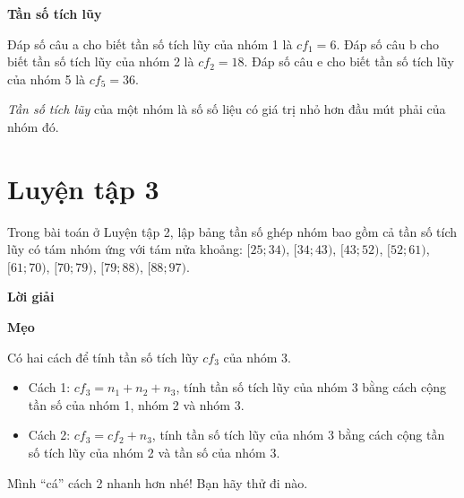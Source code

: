 \documentclass[
  letterpaper,
  DIV=11,
  numbers=noendperiod]{scrartcl}
\providecommand{\tightlist}{%
  \setlength{\itemsep}{0pt}\setlength{\parskip}{0pt}}\usepackage{longtable,booktabs,array}
\begin{document}
\begin{tcolorbox}[enhanced jigsaw, toprule=.15mm, colback=white, bottomrule=.15mm, opacityback=0, leftrule=.75mm, rightrule=.15mm, colframe=quarto-callout-note-color-frame, arc=.35mm, breakable, left=2mm]

\vspace{-3mm}\textbf{Tần số tích lũy}\vspace{3mm}

Đáp số câu a cho biết tần số tích lũy của nhóm 1 là \(cf_1=6\). Đáp số
câu b cho biết tần số tích lũy của nhóm 2 là \(cf_2=18\). Đáp số câu e
cho biết tần số tích lũy của nhóm 5 là \(cf_5=36\).

\emph{Tần số tích lũy} của một nhóm là số số liệu có giá trị nhỏ hơn đầu
mút phải của nhóm đó.

\end{tcolorbox}

\section*{Luyện tập 3}

Trong bài toán ở Luyện tập 2, lập bảng tần số ghép nhóm bao gồm cả tần
số tích lũy có tám nhóm ứng với tám nửa khoång: \([25; 34)\),
\([34; 43)\), \([43; 52)\), \([52; 61)\), \([61; 70)\), \([70; 79)\),
\([79 ; 88)\), \([88; 97)\).

\begin{center}
\textbf{Lời giải}
\end{center}

\begin{tcolorbox}[enhanced jigsaw, toprule=.15mm, colback=white, bottomrule=.15mm, opacityback=0, leftrule=.75mm, rightrule=.15mm, colframe=quarto-callout-note-color-frame, arc=.35mm, breakable, left=2mm]

\vspace{-3mm}\textbf{Mẹo}\vspace{3mm}

Có hai cách để tính tần số tích lũy \(cf_3\) của nhóm 3.

\begin{itemize}
\tightlist
\item
  Cách 1: \(cf_3=n_1+n_2+n_3\), tính tần số tích lũy của nhóm 3 bằng
  cách cộng tần số của nhóm 1, nhóm 2 và nhóm 3.
\item
  Cách 2: \(cf_3=cf_2+n_3\), tính tần số tích lũy của nhóm 3 bằng cách
  cộng tần số tích lũy của nhóm 2 và tần số của nhóm 3.
\end{itemize}

Mình ``cá'' cách 2 nhanh hơn nhé! Bạn hãy thử đi nào.

\end{tcolorbox}
\end{document}
